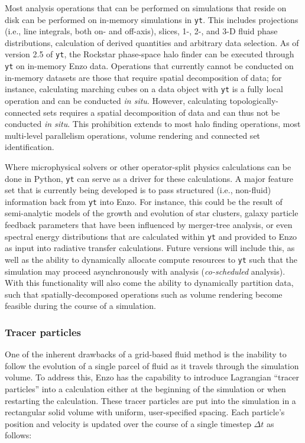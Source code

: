 Most analysis operations that can be performed on simulations that reside on
disk can be performed on in-memory simulations in \texttt{yt}.  This includes
projections (i.e., line integrals, both on- and off-axis), slices, 1-, 2-, and
3-D fluid phase distributions, calculation of derived quantities and arbitrary
data selection.  As of version 2.5 of \texttt{yt},  the Rockstar phase-space
halo finder \citep{2013ApJ...762..109B} can be executed through \texttt{yt} on
in-memory Enzo data.  Operations that currently cannot be conducted on
in-memory datasets are those that require spatial decomposition of data; for
instance, calculating marching cubes on a data object with \texttt{yt} is a
fully local operation and can be conducted \textit{in situ}.  However,
calculating topologically-connected sets requires a spatial decomposition of
data and can thus not be conducted \textit{in situ}.  This prohibition extends
to most halo finding operations, most multi-level parallelism operations,
volume rendering and connected set identification.

Where microphysical solvers or other operator-split physics calculations can be
done in Python, \texttt{yt} can serve as a driver for these calculations.  A
major feature set that is currently being developed is to pass structured
(i.e., non-fluid) information back from \texttt{yt} into Enzo.  For instance,
this could be the result of semi-analytic models of the growth and evolution of
star clusters, galaxy particle feedback parameters that have been influenced by
merger-tree analysis, or even spectral energy distributions that are calculated
within \texttt{yt} and provided to Enzo as input into radiative transfer
calculations.  Future versions will include this, as well as the ability to
dynamically allocate compute resources to \texttt{yt} such that the simulation
may proceed asynchronously with analysis (\textit{co-scheduled} analysis).
With this functionality will also come the ability to dynamically partition
data, such that spatially-decomposed operations such as volume rendering become
feasible during the course of a simulation.

\subsubsection{Tracer particles}

One of the inherent drawbacks of a grid-based fluid method is the
inability to follow the evolution of a single parcel of fluid as it
travels through the simulation volume.  To address this, Enzo has the
capability to introduce Lagrangian ``tracer particles'' into a
calculation either at the beginning of the simulation or when
restarting the calculation.  These tracer particles are put into the
simulation in a rectangular solid volume with uniform, user-specified
spacing.  Each particle's position and velocity is updated over the
course of a single timestep $\Delta t$ as follows:

